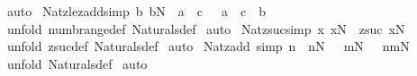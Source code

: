 \begin{isabellebody}
\isamarkupfalse%
\ auto\isanewline
{}\isamarkupfalse%
%
\endisatagproof
{\isafoldproof}%
%
\isadelimproof
\isanewline
%
\endisadelimproof
\isanewline
\isanewline
{}\isamarkupfalse%
\ Nat{\isacharunderscore}zle{\isacharunderscore}zadd{\isacharbrackleft}simp{\isacharbrackright}{\isacharcolon}\ {\isachardoublequoteopen}{\isacharbang}{\isacharbang}b{\isachardot}{\isacharbrackleft}{\isacharbar}\ b{\isacharcolon}{\isacharpercent}N\ {\isacharsemicolon}\ a\ {\isacharless}{\isacharequal}\ c\ {\isacharbar}{\isacharbrackright}\ {\isacharequal}{\isacharequal}{\isachargreater}\ a\ {\isacharless}{\isacharequal}\ c\ {\isacharplus}\ b{\isachardoublequoteclose}\isanewline
%
\isadelimproof
%
\endisadelimproof
%
\isatagproof
{}\isamarkupfalse%
\ {\isacharparenleft}unfold\ numb{\isacharunderscore}range{\isacharunderscore}def\ Naturals{\isacharunderscore}def{\isacharparenright}\isanewline
{}\isamarkupfalse%
\ auto\isanewline
{}\isamarkupfalse%
%
\endisatagproof
{\isafoldproof}%
%
\isadelimproof
\isanewline
%
\endisadelimproof
\isanewline
\isanewline
{}\isamarkupfalse%
\ Nat{\isacharunderscore}zsuc{\isacharbrackleft}simp{\isacharbrackright}{\isacharcolon}\ {\isachardoublequoteopen}{\isacharbang}{\isacharbang}x{\isachardot}\ x{\isacharcolon}{\isacharpercent}N\ {\isacharequal}{\isacharequal}{\isachargreater}\ zsuc\ x{\isacharcolon}{\isacharpercent}N{\isachardoublequoteclose}\isanewline
%
\isadelimproof
%
\endisadelimproof
%
\isatagproof
{}\isamarkupfalse%
\ {\isacharparenleft}unfold\ zsuc{\isacharunderscore}def\ Naturals{\isacharunderscore}def{\isacharparenright}\isanewline
{}\isamarkupfalse%
\ auto\isanewline
{}\isamarkupfalse%
%
\endisatagproof
{\isafoldproof}%
%
\isadelimproof
\isanewline
%
\endisadelimproof
\isanewline
{}\isamarkupfalse%
\ Nat{\isacharunderscore}zadd\ {\isacharbrackleft}simp{\isacharbrackright}{\isacharcolon}\ {\isachardoublequoteopen}{\isacharbang}{\isacharbang}n{\isachardot}\ {\isacharbrackleft}{\isacharbar}\ n{\isacharcolon}{\isacharpercent}N\ {\isacharsemicolon}\ \ m{\isacharcolon}{\isacharpercent}N\ {\isacharbar}{\isacharbrackright}\ {\isacharequal}{\isacharequal}{\isachargreater}\ n{\isacharplus}m{\isacharcolon}{\isacharpercent}N{\isachardoublequoteclose}\isanewline
%
\isadelimproof
%
\endisadelimproof
%
\isatagproof
{}\isamarkupfalse%
\ {\isacharparenleft}unfold\ Naturals{\isacharunderscore}def{\isacharparenright}\isanewline
{}\isamarkupfalse%
\ auto\isanewline

\end{isabellebody}
